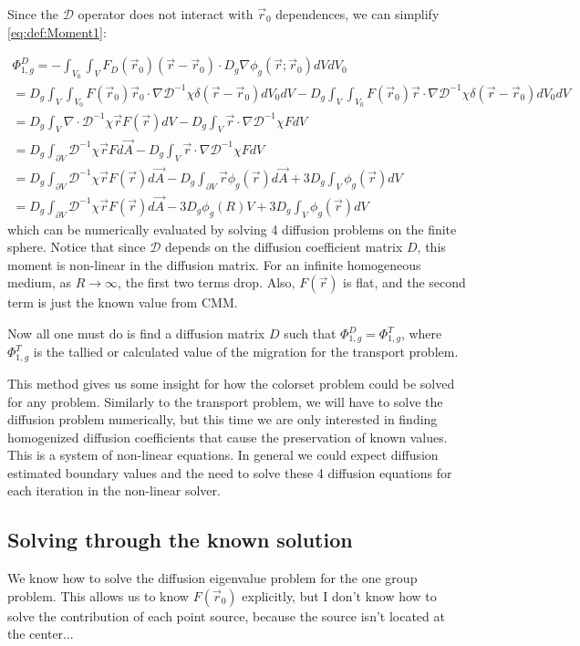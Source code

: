 \documentclass[a4paper,letterpaper,12pt,oneside,draft]{article}
\newcommand{\OpD}{\mathcal{D}}
\newcommand{\vr}{\ensuremath{\vec{r}}}
\newcommand{\dvr}{\left(\vr-\vr_0\right)}
\begin{document}
    Since the $\OpD$ operator does not interact with $\vr_0$ dependences, we can simplify \cref{eq:def:Moment1}:
    
    \begin{multline}
    \label{eq:Moment1}
        \Phi_{1,g}^D = -\int_{V_0}\int_{V} F_D(\vr_0)\dvr\cdot D_g\nabla\phi_g(\vr;\vr_0) dVdV_0 \\
        = D_g\int_V\int_{V_0} F(\vr_0)\vr_0\cdot\nabla \OpD^{-1}\chi\delta\dvr dV_0dV - D_g\int_V\int_{V_0}F(\vr_0)\vr\cdot\nabla\OpD^{-1}\chi\delta\dvr dV_0dV \\
        = D_g \int_{V}\nabla \cdot \OpD^{-1} \chi\vr F(\vr) dV - D_g\int_{V} \vr\cdot \nabla\OpD^{-1}\chi FdV \\
        = D_g \int_{\partial V} \OpD^{-1}\chi\vr Fd\vec{A} - D_g\int_{V} \vr\cdot \nabla\OpD^{-1}\chi FdV \\
        = D_g \int_{\partial V} \OpD^{-1}\chi\vr F(\vr)d\vec{A} - D_g\int_{\partial V} \vr \phi_g(\vr)d\vec{A} + 3D_g\int_V\phi_g(\vr)dV \\
        = D_g \int_{\partial V} \OpD^{-1}\chi\vr F(\vr)d\vec{A} - 3D_g\phi_g(R)V + 3D_g\int_V\phi_g(\vr)dV
    \end{multline}
    which can be numerically evaluated by solving 4 diffusion problems on the finite sphere. Notice that since $\OpD$ depends on the diffusion coefficient matrix $D$, this moment is non-linear in the diffusion matrix. For an infinite homogeneous medium, as $R\to\infty$, the first two terms drop. Also, $F(\vr)$ is flat, and the second term is just the known value from CMM.
    
    Now all one must do is find a diffusion matrix $D$ such that $\Phi_{1,g}^D=\Phi_{1,g}^T$, where $\Phi_{1,g}^T$ is the tallied or calculated value of the migration for the transport problem. 
    
    This method gives us some insight for how the colorset problem could be solved for any problem. Similarly to the transport problem, we will have to solve the diffusion problem numerically, but this time we are only interested in finding homogenized diffusion coefficients that cause the preservation of known values. This is a system of non-linear equations. In general we could expect diffusion estimated boundary values and the need to solve these 4 diffusion equations for each iteration in the non-linear solver.
    
    \subsection{Solving through the known solution}
    We know how to solve the diffusion eigenvalue problem for the one group problem. This allows us to know $F(\vr_0)$ explicitly, but I don't know how to solve the contribution of each point source, because the source isn't located at the center...
\end{document}
